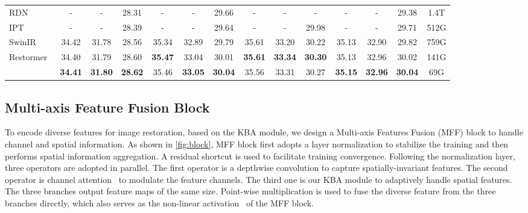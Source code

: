 \documentclass[default,iicol]{sn-jnl}
\theoremstyle{thmstyleone}\newtheorem{theorem}{Theorem}\newtheorem{proposition}[theorem]{Proposition}
\theoremstyle{thmstyletwo}\newtheorem{example}{Example}\newtheorem{remark}{Remark}
\theoremstyle{thmstylethree}\newtheorem{definition}{Definition}
\begin{document}
\begin{table*}[t]
{\begin{tabular}{l | c c c | c c c | c c c | c c c | c}
RDN~\cite{zhang2020rdn}  &-&-&28.31&-&-&29.66&-&-&-&-&-&29.38& 1.4T\\  IPT~\cite{chen2021IPT}  &-&-&28.39&-&-&29.64&-&-&29.98&-&-&29.71 & 512G\\
SwinIR~\cite{liang2021swinir} &  {34.42} &  {31.78} &  {28.56} &  {35.34} &  {32.89} &  {29.79} &  {35.61} &  {33.20} &  {30.22} &  {35.13} &  {32.90} &  {29.82} & 759G\\
Restormer~\cite{restormer} &  {34.40} &  {31.79}&  {28.60}&  \textbf{35.47} &  {33.04}&  {30.01}&  \textbf{35.61}&  \textbf{33.34}&  \textbf{30.30} &  {35.13}&  {32.96}&  {30.02} & 141G\\ 
  & \textbf{34.41} & \textbf{31.80} & \textbf{28.62} & 35.46 & \textbf{33.05} & \textbf{30.04} & 35.56 & 33.31 & 30.27 & \textbf{35.15}  & \textbf{32.96} &  \textbf{30.04} & 69G\\
\bottomrule

\end{tabular}}
    
    \label{tab:c_gaussian}
\end{table*}
\renewcommand{\arraystretch}{1.}  \subsection{Multi-axis Feature Fusion Block}
To encode diverse features for image restoration, based on the KBA module, we design a Multi-axis Features Fusion (MFF) block to handle channel and spatial information. 
As shown in \cref{fig:block}, MFF block first adopts a layer normalization to stabilize the training and then performs spatial information aggregation.  A residual shortcut is used to facilitate training convergence.
Following the normalization layer, three operators are adopted in parallel. The first operator is a  depthwise convolution to capture spatially-invariant features. The second operator is channel attention~\cite{hu2019squeeze} to modulate the feature channels. The third one is our KBA module to adaptively handle spatial features.
The three branches output feature maps of the same size.
Point-wise multiplication is used to fuse the diverse feature from the three branches directly, which also serves as the non-linear activation~\cite{chen2022nafnet} of the MFF block.
\end{document}
